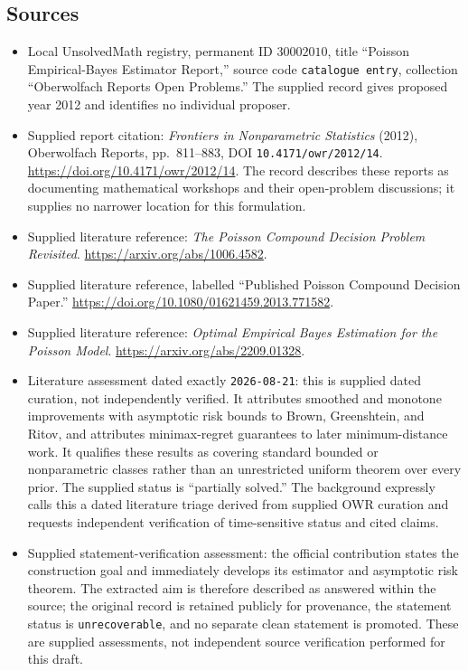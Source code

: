 \documentclass[11pt]{article}
\begin{document}
\subsection{Sources}
\begin{itemize}
\item Local UnsolvedMath registry, permanent ID \(30002010\), title ``Poisson Empirical-Bayes Estimator Report,'' source code \texttt{catalogue entry}, collection ``Oberwolfach Reports Open Problems.'' The supplied record gives proposed year 2012 and identifies no individual proposer.
\item Supplied report citation: \emph{Frontiers in Nonparametric Statistics} (2012), Oberwolfach Reports, pp.\ 811--883, DOI \texttt{10.4171/owr/2012/14}. \url{https://doi.org/10.4171/owr/2012/14}. The record describes these reports as documenting mathematical workshops and their open-problem discussions; it supplies no narrower location for this formulation.
\item Supplied literature reference: \emph{The Poisson Compound Decision Problem Revisited}. \url{https://arxiv.org/abs/1006.4582}.
\item Supplied literature reference, labelled ``Published Poisson Compound Decision Paper.'' \url{https://doi.org/10.1080/01621459.2013.771582}.
\item Supplied literature reference: \emph{Optimal Empirical Bayes Estimation for the Poisson Model}. \url{https://arxiv.org/abs/2209.01328}.
\item Literature assessment dated exactly \texttt{2026-08-21}: this is supplied dated curation, not independently verified. It attributes smoothed and monotone improvements with asymptotic risk bounds to Brown, Greenshtein, and Ritov, and attributes minimax-regret guarantees to later minimum-distance work. It qualifies these results as covering standard bounded or nonparametric classes rather than an unrestricted uniform theorem over every prior. The supplied status is ``partially solved.'' The background expressly calls this a dated literature triage derived from supplied OWR curation and requests independent verification of time-sensitive status and cited claims.
\item Supplied statement-verification assessment: the official contribution states the construction goal and immediately develops its estimator and asymptotic risk theorem. The extracted aim is therefore described as answered within the source; the original record is retained publicly for provenance, the statement status is \texttt{unrecoverable}, and no separate clean statement is promoted. These are supplied assessments, not independent source verification performed for this draft.
\end{itemize}
\end{document}
